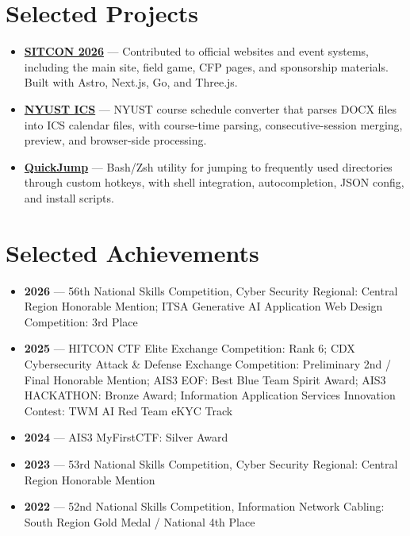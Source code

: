 \documentclass[10pt,a4paper]{article}
\begin{document}
\section*{Selected Projects}
\begin{itemize}
  \item \textbf{\href{https://sitcon.org/2026}{SITCON 2026}} --- Contributed to official websites and event systems, including the main site, field game, CFP pages, and sponsorship materials. Built with Astro, Next.js, Go, and Three.js.
  \item \textbf{\href{https://nyust-ics.osga.dev}{NYUST ICS}} --- NYUST course schedule converter that parses DOCX files into ICS calendar files, with course-time parsing, consecutive-session merging, preview, and browser-side processing.
  \item \textbf{\href{https://github.com/osga24/Quick-Jump}{QuickJump}} --- Bash/Zsh utility for jumping to frequently used directories through custom hotkeys, with shell integration, autocompletion, JSON config, and install scripts.
\end{itemize}

\section*{Selected Achievements}
\begin{itemize}
  \item \textbf{2026} --- 56th National Skills Competition, Cyber Security Regional: Central Region Honorable Mention; ITSA Generative AI Application Web Design Competition: 3rd Place
  \item \textbf{2025} --- HITCON CTF Elite Exchange Competition: Rank 6; CDX Cybersecurity Attack \& Defense Exchange Competition: Preliminary 2nd / Final Honorable Mention; AIS3 EOF: Best Blue Team Spirit Award; AIS3 HACKATHON: Bronze Award; Information Application Services Innovation Contest: TWM AI Red Team eKYC Track
  \item \textbf{2024} --- AIS3 MyFirstCTF: Silver Award
  \item \textbf{2023} --- 53rd National Skills Competition, Cyber Security Regional: Central Region Honorable Mention
  \item \textbf{2022} --- 52nd National Skills Competition, Information Network Cabling: South Region Gold Medal / National 4th Place
\end{itemize}
\end{document}
